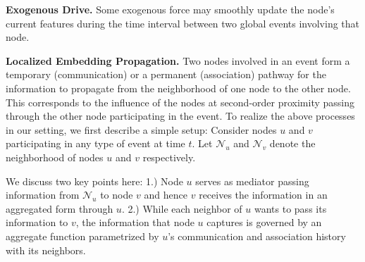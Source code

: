 \documentclass[11pt]{article}
\begin{document}
{\bf Exogenous Drive.} Some exogenous force may smoothly update the node's current features during the time interval between two global events involving that node. 

{\bf Localized Embedding Propagation.} Two nodes involved in an event form a temporary (communication) or a permanent (association) pathway for the information to propagate from the neighborhood of one node to the other node. This corresponds to the influence of the nodes at second-order proximity passing through the other node participating in the event. 
To realize the above processes in our setting, we first describe a simple setup: Consider nodes $u$ and $v$ participating in any type of event at time $t$. Let $\mathcal{N}_u$ and $\mathcal{N}_v$ denote the neighborhood of nodes $u$ and $v$ respectively. 

We discuss two key points here: 1.) Node $u$ serves as mediator passing information from $\mathcal{N}_u$ to node $v$ and hence $v$ receives the information in an aggregated form through $u$. 2.) While each neighbor of $u$ wants to pass its information  to $v$, the information that node $u$ captures is governed by an aggregate function parametrized by $u$'s communication and association history with its neighbors. 
\end{document}
